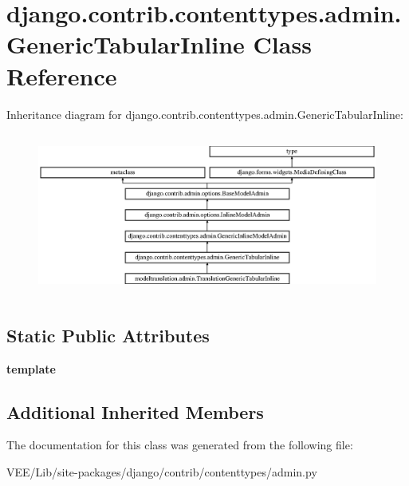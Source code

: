 \hypertarget{classdjango_1_1contrib_1_1contenttypes_1_1admin_1_1_generic_tabular_inline}{}\section{django.\+contrib.\+contenttypes.\+admin.\+Generic\+Tabular\+Inline Class Reference}
\label{classdjango_1_1contrib_1_1contenttypes_1_1admin_1_1_generic_tabular_inline}
Inheritance diagram for django.\+contrib.\+contenttypes.\+admin.\+Generic\+Tabular\+Inline\+:\begin{figure}[H]
\begin{center}
\leavevmode
\includegraphics[height=5.414365cm]{classdjango_1_1contrib_1_1contenttypes_1_1admin_1_1_generic_tabular_inline}
\end{center}
\end{figure}
\subsection*{Static Public Attributes}
\begin{DoxyCompactItemize}
\item 
\mbox{\label{classdjango_1_1contrib_1_1contenttypes_1_1admin_1_1_generic_tabular_inline_af437be13590b2f71317c97825058ec29}} 
{\bfseries template}
\end{DoxyCompactItemize}
\subsection*{Additional Inherited Members}


The documentation for this class was generated from the following file\+:\begin{DoxyCompactItemize}
\item 
V\+E\+E/\+Lib/site-\/packages/django/contrib/contenttypes/admin.\+py\end{DoxyCompactItemize}
